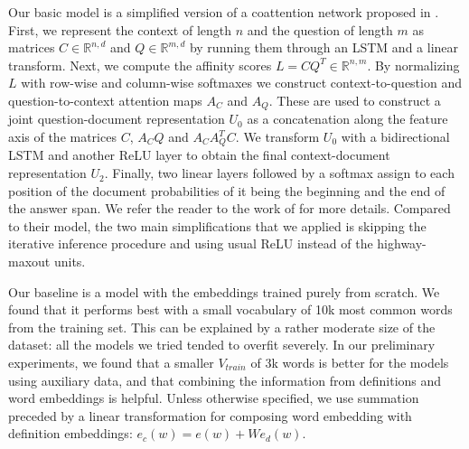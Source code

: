 Our basic model is a simplified version of a coattention network proposed in \citep{xiong2017dynamic}. First, we represent the context of length $n$ and the question of length $m$ as matrices $C\in\mathbb{R}^{n,d}$ and $Q \in\mathbb{R}^{m,d}$ by running them through an LSTM and a linear transform. Next, we compute the affinity scores $L=CQ^T \in \mathbb{R}^{n, m}$. By normalizing $L$ with row-wise and column-wise softmaxes we construct context-to-question and question-to-context attention maps $A_C$ and $A_Q$. These are used to construct a joint question-document representation $U_0$ as a concatenation along the feature axis of the matrices $C$, $A_CQ$ and $A_C A_Q^T C$. We transform $U_0$ with a bidirectional LSTM and another ReLU\citep{glorot2011deep} layer to obtain the final context-document representation $U_2$. Finally, two linear layers followed by a softmax assign to each position of the document probabilities of it being the beginning and the end of the answer span. We refer the reader to the work of \citet{xiong2017dynamic} for more details. Compared to their model, the two main simplifications that we applied is skipping the iterative inference procedure and using usual ReLU instead of the highway-maxout units.

Our baseline is a model with the embeddings trained purely from scratch. We found that it performs best with a small vocabulary of 10k most common words from the training set. This can be explained by a rather moderate size of the dataset: all the models we tried tended to overfit severely. In our preliminary experiments, we found that a smaller $V_{train}$ of 3k words is better for the models using auxiliary data, and that combining the information from definitions and word embeddings is helpful.
Unless otherwise specified, we use summation preceded by a linear transformation for composing word embedding with definition embeddings: $e_c(w) = e(w) + W e_d(w)$. 

